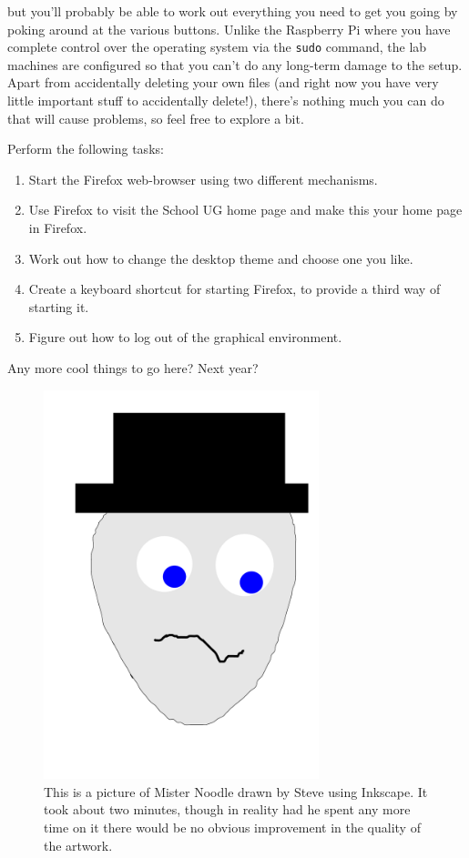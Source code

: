 \noindent{}

\noindent but you'll probably be able to work out everything you need to get you going by poking around at the various buttons. Unlike the Raspberry Pi where you have complete control over the operating system via the \texttt{sudo} command, the lab machines are configured so that you can't do any long-term damage to the setup. Apart from accidentally deleting your own files (and right now you have very little important stuff to accidentally delete!), there's nothing much you can do that will cause problems, so feel free to explore a bit. 

Perform the following tasks:
\begin{enumerate}
\item Start the Firefox web-browser using two different mechanisms.
\item Use Firefox to visit the School UG home page
   and make this your
  home page in Firefox.
\item Work out how to change the desktop theme and choose one you like.
\item Create a keyboard shortcut for starting Firefox, to provide a third way of starting it.
\item Figure out how to log out of the graphical environment.\label{list:logout}
\end{enumerate}

\begin{note}
Any more cool things to go here? Next year?  
\end{note}

\begin{figure}[t]
\centerline{\includegraphics[width=8cm]{images/mrnoodle}}
\caption{This is a picture of Mister Noodle drawn by Steve using Inkscape. It took about two minutes, though in reality had he spent any more time on it there would be no obvious improvement in the quality of the artwork.}\label{figure:mrnoodle}
\end{figure}


